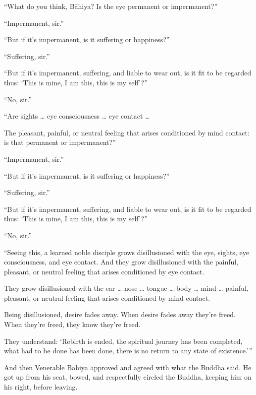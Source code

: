 \documentclass[12pt,openany]{book}%
\begin{document}
“What do you think, \textsanskrit{Bāhiya}? Is the eye permanent or impermanent?” 

“Impermanent, sir.” 

“But if it’s impermanent, is it suffering or happiness?” 

“Suffering, sir.” 

“But if it’s impermanent, suffering, and liable to wear out, is it fit to be regarded thus: ‘This is mine, I am this, this is my self’?” 

“No, sir.” 

“Are sights … eye consciousness … eye contact … 

The pleasant, painful, or neutral feeling that arises conditioned by mind contact: is that permanent or impermanent?” 

“Impermanent, sir.” 

“But if it’s impermanent, is it suffering or happiness?” 

“Suffering, sir.” 

“But if it’s impermanent, suffering, and liable to wear out, is it fit to be regarded thus: ‘This is mine, I am this, this is my self’?” 

“No, sir.” 

“Seeing this, a learned noble disciple grows disillusioned with the eye, sights, eye consciousness, and eye contact. And they grow disillusioned with the painful, pleasant, or neutral feeling that arises conditioned by eye contact. 

They grow disillusioned with the ear … nose … tongue … body … mind … painful, pleasant, or neutral feeling that arises conditioned by mind contact. 

Being disillusioned, desire fades away. When desire fades away they’re freed. When they’re freed, they know they’re freed. 

They understand: ‘Rebirth is ended, the spiritual journey has been completed, what had to be done has been done, there is no return to any state of existence.’” 

And then Venerable \textsanskrit{Bāhiya} approved and agreed with what the Buddha said. He got up from his seat, bowed, and respectfully circled the Buddha, keeping him on his right, before leaving. 
\end{document}
